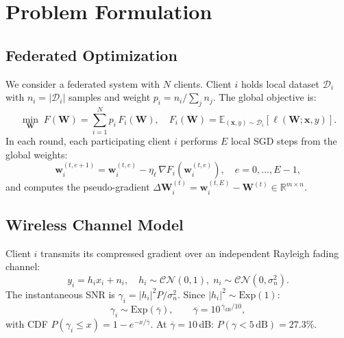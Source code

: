 \documentclass[conference]{IEEEtran}
\begin{document}
\section{Problem Formulation}

\subsection{Federated Optimization}

We consider a federated system with $N$ clients. Client $i$ holds local dataset $\mathcal{D}_i$ with $n_i = |\mathcal{D}_i|$ samples and weight $p_i = n_i / \sum_j n_j$. The global objective is:
\begin{equation}
    \min_{\mathbf{W}}\; F(\mathbf{W}) = \sum_{i=1}^{N} p_i\, F_i(\mathbf{W}),
    \quad
    F_i(\mathbf{W}) = \mathbb{E}_{(\mathbf{x},y)\sim\mathcal{D}_i}\!\left[\ell(\mathbf{W};\mathbf{x},y)\right].
\end{equation}
In each round, each participating client $i$ performs $E$ local SGD steps from the global weights:
\begin{equation}
    \mathbf{w}_i^{(t,e+1)} = \mathbf{w}_i^{(t,e)} - \eta_\ell\,\nabla F_i\!\left(\mathbf{w}_i^{(t,e)}\right), \quad e = 0,\ldots,E-1,
\end{equation}
and computes the pseudo-gradient $\Delta\mathbf{W}_i^{(t)} = \mathbf{w}_i^{(t,E)} - \mathbf{W}^{(t)} \in \mathbb{R}^{m\times n}$.

\subsection{Wireless Channel Model}

Client $i$ transmits its compressed gradient over an independent Rayleigh fading channel:
\begin{equation}
    y_i = h_i x_i + n_i, \quad h_i \sim \mathcal{CN}(0,1),\; n_i \sim \mathcal{CN}(0,\sigma_n^2).
\end{equation}
The instantaneous SNR is $\gamma_i = |h_i|^2 P / \sigma_n^2$. Since $|h_i|^2 \sim \mathrm{Exp}(1)$:
\begin{equation}
    \gamma_i \sim \mathrm{Exp}(\overline{\gamma}), \qquad \overline{\gamma} = 10^{\,\overline{\gamma}_{\mathrm{dB}}/10},
\end{equation}
with CDF $P(\gamma_i \leq x) = 1 - e^{-x/\overline{\gamma}}$. At $\overline{\gamma} = 10$\,dB: $P(\gamma < 5\,\text{dB}) = 27.3\%$.
\end{document}
